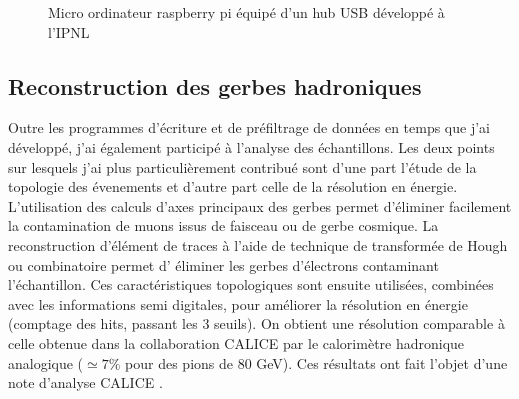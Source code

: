\documentclass[11pt,french]{article}
\begin{document}
\begin{figure}
\centerline{}
\caption{Micro ordinateur raspberry pi \'equip\'e d'un hub USB d\'evelopp\'e \`a l'IPNL }
\label{rpi}
\end{figure}
\subsection*{Reconstruction des gerbes hadroniques}

Outre les programmes d'\'ecriture et de pr\'efiltrage de donn\'ees en temps que j'ai d\'evelopp\'e, j'ai \'egalement particip\'e \`a l'analyse des \'echantillons. Les deux points sur lesquels j'ai plus particuli\`erement contribu\'e sont d'une part l'\'etude de la topologie des \'evenements et d'autre part celle de la r\'esolution en \'energie. L'utilisation des calculs d'axes principaux des gerbes permet d'\'eliminer facilement la contamination de muons issus de faisceau ou de gerbe cosmique. La reconstruction d'\'el\'ement de traces \`a l'aide de technique de transform\'ee de Hough ou combinatoire permet d' \'eliminer les gerbes d'\'electrons contaminant l'\'echantillon. Ces caract\'eristiques topologiques sont ensuite utilis\'ees, combin\'ees avec les informations semi digitales, pour am\'eliorer la r\'esolution en \'energie (comptage des hits, passant les 3 seuils). On obtient une r\'esolution comparable \`a celle obtenue dans la collaboration CALICE par le calorim\`etre hadronique analogique ($\simeq 7 \% $  pour des pions de 80 GeV). Ces r\'esultats ont fait l'objet d'une note d'analyse CALICE \cite{can37}.   
      
\end{document}
